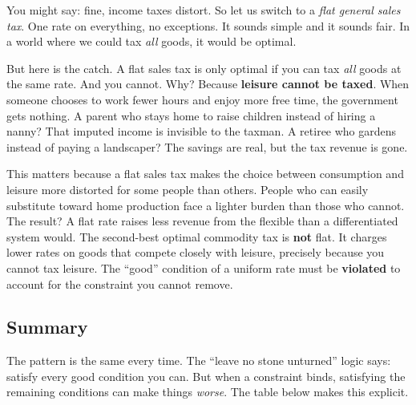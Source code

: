 \documentclass[11pt]{article}
\begin{document}
You might say: fine, income taxes distort. So let us switch to a \textit{flat general sales tax}. One rate on everything, no exceptions. It sounds simple and it sounds fair. In a world where we could tax \textit{all} goods, it would be optimal.

But here is the catch. A flat sales tax is only optimal if you can tax \textit{all} goods at the same rate. And you cannot. Why? Because \textbf{leisure cannot be taxed}. When someone chooses to work fewer hours and enjoy more free time, the government gets nothing. A parent who stays home to raise children instead of hiring a nanny? That imputed income is invisible to the taxman. A retiree who gardens instead of paying a landscaper? The savings are real, but the tax revenue is gone.

This matters because a flat sales tax makes the choice between consumption and leisure more distorted for some people than others. People who can easily substitute toward home production face a lighter burden than those who cannot. The result? A flat rate raises less revenue from the flexible than a differentiated system would. The second-best optimal commodity tax is \textbf{not} flat. It charges lower rates on goods that compete closely with leisure, precisely because you cannot tax leisure. The ``good'' condition of a uniform rate must be \textbf{violated} to account for the constraint you cannot remove.

\subsection{Summary}

The pattern is the same every time. The ``leave no stone unturned'' logic says: satisfy every good condition you can. But when a constraint binds, satisfying the remaining conditions can make things \textit{worse}. The table below makes this explicit.
\end{document}
